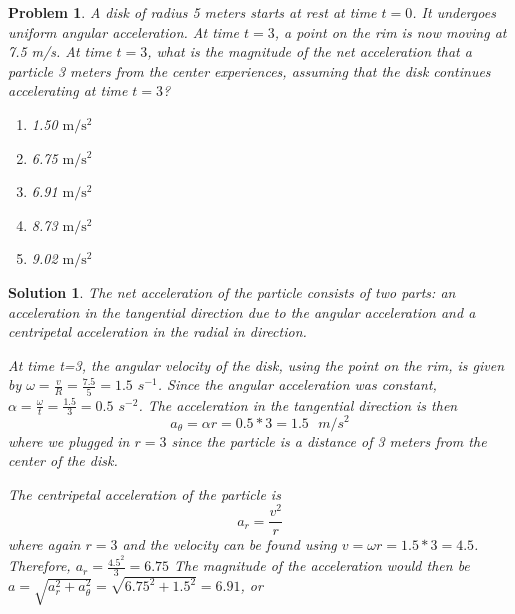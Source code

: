 \documentclass[12pt]{article}
\newcommand{\clearpts}{\addtocounter{tpts}{\value{cpts}} \setcounter{cpts}{0}}
\newcommand{\pts}[1]{\clearpts \setcounter{cpts}{#1}}
\newtheorem*{solution}{Solution}
\theoremstyle{mystyle}
\newtheorem{pproblem}{Problem}
\begin{document}
\pts{2}
\begin{pproblem}
    A disk of radius 5 meters starts at rest at time $t = 0$. It undergoes uniform angular acceleration. At time $t = 3$, a point on the rim is now moving at 7.5 m/s. At time $t = 3$, what is the magnitude of the net acceleration that a particle 3 meters from the center experiences, assuming that the disk continues accelerating at time $t = 3$? 
    \begin{enumerate}[label = (\Alph*)]
        \item 1.50 $\mathrm{m/s^2}$ 
        \item 6.75 $\mathrm{m/s^2}$ 
        \item 6.91 $\mathrm{m/s^2}$ 
        \item 8.73 $\mathrm{m/s^2}$ 
        \item 9.02 $\mathrm{m/s^2}$ 
    \end{enumerate}
\end{pproblem}
\begin{solution}
    The net acceleration of the particle consists of two parts: an acceleration in the tangential direction due to the angular acceleration and a centripetal acceleration in the radial in direction. 

    At time t=3, the angular velocity of the disk, using the point on the rim, is given by $\omega = \frac{v}{R} = \frac{7.5}{5} = 1.5$ $s^{-1}$. Since the angular acceleration was constant, $\alpha = \frac{\omega}{t} = \frac{1.5}{3} = 0.5$ $s^{-2}$. The acceleration in the tangential direction is then
    $$a_\theta = \alpha r = 0.5*3 = 1.5\text{ }m/s^{2}$$ where we plugged in $r = 3$ since the particle is a distance of 3 meters from the center of the disk. 

    The centripetal acceleration of the particle is
    $$a_r = \frac{v^2}{r}$$ where again $r = 3$ and the velocity can be found using $v = \omega r = 1.5*3 = 4.5$. Therefore, $a_r = \frac{4.5^2}{3} = 6.75$
    The magnitude of the acceleration would then be $a = \sqrt{a_r^2 + a_\theta^2} = \sqrt{6.75^2 + 1.5^2} = 6.91$, or 
\end{solution}
\end{document}
